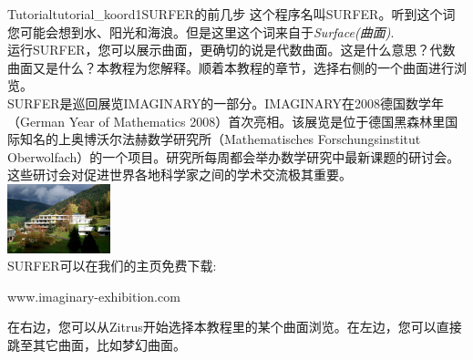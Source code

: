﻿\begin{surferIntroPage}{Tutorial}{tutorial_koord1}{SURFER的前几步}
这个程序名叫SURFER。听到这个词您可能会想到水、阳光和海浪。但是这里这个词来自于{\it Surface(曲面)}.
\\
运行SURFER，您可以展示曲面，更确切的说是代数曲面。这是什么意思？代数曲面又是什么？本教程为您解释。顺着本教程的章节，选择右侧的一个曲面进行浏览。\\
SURFER是巡回展览IMAGINARY的一部分。IMAGINARY在2008德国数学年（German Year of Mathematics 2008）首次亮相。该展览是位于德国黑森林里国际知名的上奥博沃尔法赫数学研究所（Mathematisches Forschungsinstitut Oberwolfach）的一个项目。研究所每周都会举办数学研究中最新课题的研讨会。这些研讨会对促进世界各地科学家之间的学术交流极其重要。\\
\vspace{0.2cm} \hspace{3.5cm}\includegraphics[width=3cm]{./../../common/images/photo_mfo.jpg}\\
SURFER可以在我们的主页免费下载: \\
\begin{centering}
www.imaginary-exhibition.com\\
\end{centering}
 \vspace{0.2cm}
在右边，您可以从Zitrus开始选择本教程里的某个曲面浏览。在左边，您可以直接跳至其它曲面，比如梦幻曲面。
\end{surferIntroPage}

